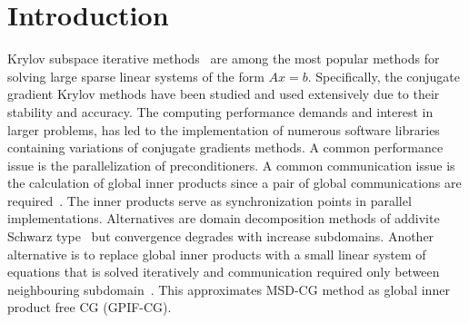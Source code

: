 \section{Introduction}
\label{sec:introduction}

Krylov subspace iterative methods~\cite{iterativeGPU} are among the most popular methods for
solving large sparse linear systems of the form $Ax = b$. Specifically, the conjugate gradient
Krylov methods have been studied and used extensively due to their stability and accuracy.
The computing performance demands and interest in larger problems,
has led to the implementation of numerous software libraries containing variations of
conjugate gradients methods. A common performance issue is the parallelization of preconditioners.
A common communication issue is the calculation of global inner products since a pair of
global communications are required~\cite{gu2004msdcg}. The inner products serve as synchronization points
in parallel implementations. Alternatives are domain decomposition methods of
addivite Schwarz type~\cite{tang1992schwarz} but convergence degrades with increase subdomains.
Another alternative is to replace global inner products with a small linear system of equations that
is solved iteratively and communication required only between neighbouring subdomain~\cite{gu2004msdcg}.
This approximates MSD-CG method as global inner product free CG (GPIF-CG).


